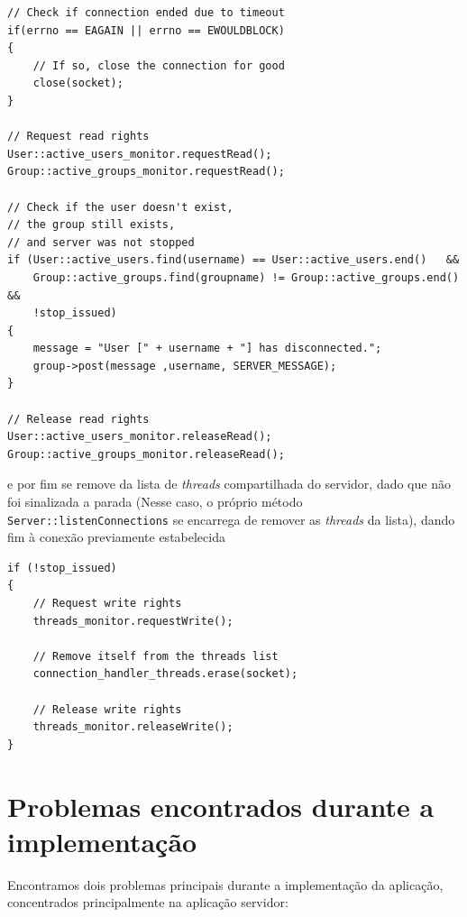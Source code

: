 \documentclass{article}
\begin{document}
\begin{itemize}
\begin{lstlisting}[xleftmargin=-.2\textwidth, xrightmargin=-.2\textwidth]
// Check if connection ended due to timeout
if(errno == EAGAIN || errno == EWOULDBLOCK)
{
    // If so, close the connection for good
    close(socket);
}

// Request read rights
User::active_users_monitor.requestRead();
Group::active_groups_monitor.requestRead();

// Check if the user doesn't exist, 
// the group still exists, 
// and server was not stopped
if (User::active_users.find(username) == User::active_users.end()   &&
    Group::active_groups.find(groupname) != Group::active_groups.end() &&
    !stop_issued)
{
    message = "User [" + username + "] has disconnected.";
    group->post(message ,username, SERVER_MESSAGE);
}

// Release read rights
User::active_users_monitor.releaseRead();
Group::active_groups_monitor.releaseRead();
\end{lstlisting}
e por fim se remove da lista de \textit{threads} compartilhada do servidor, dado que não foi sinalizada a parada (Nesse caso, o próprio método \texttt{Server::listenConnections} se encarrega de remover as \textit{threads} da lista), dando fim à conexão previamente estabelecida
\\
\begin{lstlisting}
if (!stop_issued)
{
    // Request write rights
    threads_monitor.requestWrite();

    // Remove itself from the threads list
    connection_handler_threads.erase(socket);

    // Release write rights
    threads_monitor.releaseWrite();
}
\end{lstlisting}
\end{itemize}
\section{Problemas encontrados durante a implementação}
Encontramos dois problemas principais durante a implementação da aplicação, concentrados principalmente na aplicação servidor:
\end{document}
